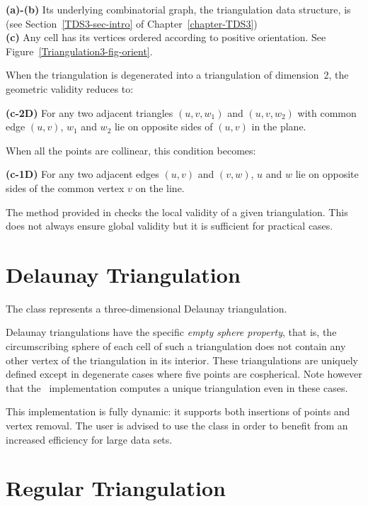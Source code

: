 {\bf (a)-(b)} Its underlying combinatorial graph, the triangulation
data structure, is  
(see Section~\ref{TDS3-sec-intro} of Chapter~\ref{chapter-TDS3})\\
{\bf (c)} Any cell has its vertices ordered according to positive
orientation. See Figure~\ref{Triangulation3-fig-orient}.

When the triangulation is degenerated into a triangulation of
dimension~2, the  geometric validity reduces to:

{\bf (c-2D)} For any two adjacent triangles $(u,v,w_1)$ and $(u,v,w_2)$ with
common edge $(u,v)$, $w_1$ and $w_2$ lie on opposite sides of $(u,v)$
in the plane.

When all the points are collinear, this condition becomes:

{\bf (c-1D)} For any two adjacent edges $(u,v)$ and $(v,w)$, $u$ and
$w$ lie on opposite sides of the common vertex $v$ on the line.

The  method provided in  checks
the local validity of a given triangulation. This does not always
ensure global validity \cite{mnssssu-cgpvg-96,dlpt-ccpps-98} but it is 
sufficient for practical cases.


\section{Delaunay Triangulation} 

The class  represents a three-dimensional
Delaunay triangulation.

Delaunay triangulations have the specific \textit{empty sphere property},
that is, the circumscribing sphere of each cell of such a triangulation
does not contain any other vertex of the triangulation in its interior.
These triangulations are uniquely defined except in degenerate cases
where five points are cospherical.  Note however that the \cgal\ implementation
computes a unique triangulation even in these cases.

This implementation is fully dynamic: it supports both insertions of points
and vertex removal.
The user is advised to use the class  in
order to benefit from an increased efficiency for large data sets. 

\section{Regular Triangulation} 
\label{Triangulation3-sec-class-Regulartriangulation}

